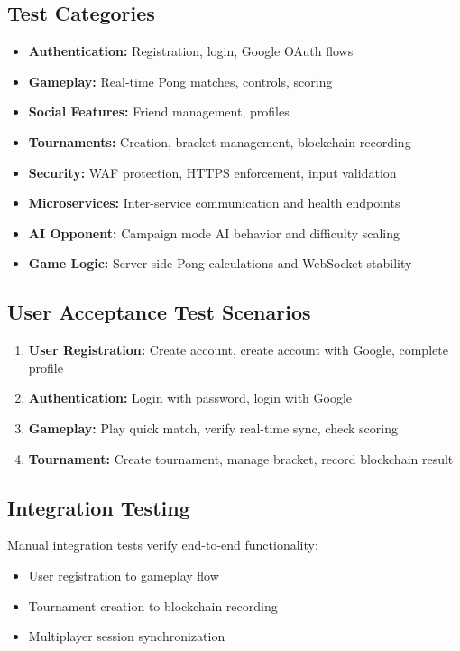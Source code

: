 \documentclass[11pt,a4paper]{report}
\begin{document}
\subsection{Test Categories}
\begin{itemize}
  \item \textbf{Authentication:} Registration, login, Google OAuth flows
  \item \textbf{Gameplay:} Real-time Pong matches, controls, scoring
  \item \textbf{Social Features:} Friend management, profiles
  \item \textbf{Tournaments:} Creation, bracket management, blockchain recording
  \item \textbf{Security:} WAF protection, HTTPS enforcement, input validation
  \item \textbf{Microservices:} Inter-service communication and health endpoints
  \item \textbf{AI Opponent:} Campaign mode AI behavior and difficulty scaling
  \item \textbf{Game Logic:} Server-side Pong calculations and WebSocket stability
\end{itemize}

\subsection{User Acceptance Test Scenarios}
\begin{enumerate}
  \item \textbf{User Registration:} Create account, create account with Google, complete profile
  \item \textbf{Authentication:} Login with password, login with Google
  \item \textbf{Gameplay:} Play quick match, verify real-time sync, check scoring
  \item \textbf{Tournament:} Create tournament, manage bracket, record blockchain result
\end{enumerate}

\subsection{Integration Testing}
Manual integration tests verify end-to-end functionality:
\begin{itemize}
  \item User registration to gameplay flow
  \item Tournament creation to blockchain recording
  \item Multiplayer session synchronization
\end{itemize}
\end{document}

